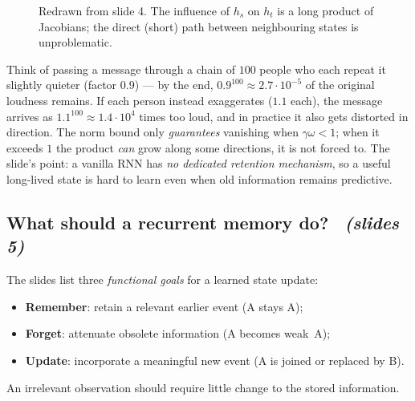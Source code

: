 \documentclass[11pt,a4paper]{article}
\newcommand{\sltag}[1]{\texorpdfstring{\ \emph{(slides #1)}}{ (slides #1)}}
\begin{document}
\begin{figure}[H]\centering
{}
\caption{Redrawn from slide 4. The influence of $h_s$ on $h_t$ is a long product of Jacobians; the direct (short) path between neighbouring states is unproblematic.}
\end{figure}

\begin{intuition}
Think of passing a message through a chain of $100$ people who each repeat it slightly quieter (factor $0.9$) --- by the end, $0.9^{100}\approx2.7\cdot10^{-5}$ of the original loudness remains. If each person instead exaggerates ($1.1$ each), the message arrives as $1.1^{100}\approx1.4\cdot10^{4}$ times too loud, and in practice it also gets distorted in direction. The norm bound only \emph{guarantees} vanishing when $\gamma\omega<1$; when it exceeds $1$ the product \emph{can} grow along some directions, it is not forced to. The slide's point: a vanilla RNN has \emph{no dedicated retention mechanism}, so a useful long-lived state is hard to learn even when old information remains predictive.
\end{intuition}

\subsection{What should a recurrent memory do? \sltag{5}}

The slides list three \emph{functional goals} for a learned state update:
\begin{itemize}
 \item \textbf{Remember}: retain a relevant earlier event (A stays A);
 \item \textbf{Forget}: attenuate obsolete information (A becomes weak~A);
 \item \textbf{Update}: incorporate a meaningful new event (A is joined or replaced by B).
\end{itemize}
An irrelevant observation should require little change to the stored information.
\end{document}
